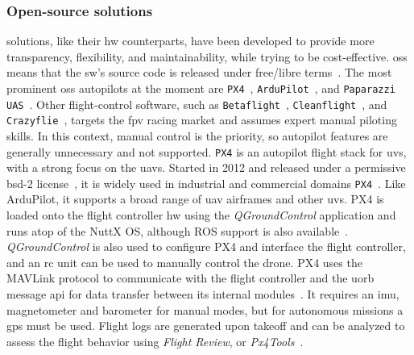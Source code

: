 \subsubsection{Open-source solutions}%
\label{sec:open-source-solut-sw}
 solutions, like their \gls{hw} counterparts, have been
developed to provide more transparency, flexibility, and
maintainability, while trying to be cost-effective. \gls{oss} means that the
\gls{sw}'s source code is released under free/libre
terms~\cite{freeGNU}. The most prominent \gls{oss} autopilots at the moment are
\lstinline{PX4}~\cite{px4-github},
\lstinline{ArduPilot}~\cite{arduPilot-github}, and
\lstinline{Paparazzi UAS}~\cite{paparazzi-github}.
Other flight-control software, such as
\lstinline{Betaflight}~\cite{betaflight-github},
\lstinline{Cleanflight}~\cite{cleanflight-github}, and
\lstinline{Crazyflie}~\cite{crazyflie-home}, targets the \gls{fpv} racing
market and assumes expert manual piloting skills. In this context, manual
control is the priority, so autopilot features are generally unnecessary and not
supported.
%
%
%
\lstinline{PX4} is an autopilot flight stack for \glspl{uv}, with a strong focus on the
\glspl{uav}. Started in 2012 and released under
a permissive \gls{bsd}-2 license~\cite{px4-github}, it is widely used in
industrial and commercial domains
\lstinline{PX4}~\cite{skynodeX-px4,spRacing-px4}. Like ArduPilot, it supports a
broad range of \gls{uav} airframes and other \glspl{uv}.
%
PX4 is loaded onto
the flight controller \gls{hw} using the \emph{QGroundControl}
application and runs atop of the NuttX OS, although ROS support is also
available~\cite{jargalsaikhan2022architectural}. \emph{QGroundControl} is also
used to configure PX4 and interface the flight controller, and an \gls{rc} unit
can be used to manually control the drone.
%
PX4 uses the MAVLink protocol to communicate with the flight controller and the
\gls{uorb} message \gls{api} for data transfer between its internal
modules~\cite{px4-sysArch,jargalsaikhan2022architectural}. It requires an
\gls{imu}, magnetometer and barometer for manual modes, but for autonomous
missions a \gls{gps} must be used. Flight logs are generated upon takeoff and
can be analyzed to assess the flight behavior using \emph{Flight Review}, or
\emph{Px4Tools}~\cite{glossner2021overview}. 

